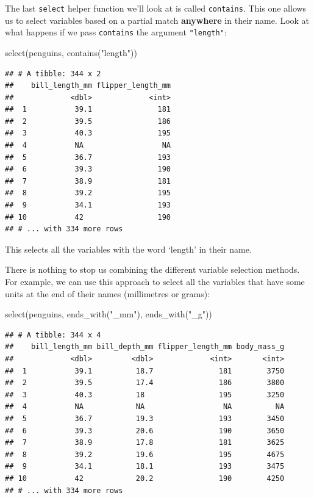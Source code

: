 \documentclass[
]{book}
\newenvironment{Shaded}{\begin{snugshade}}{\end{snugshade}}
\newcommand{\FunctionTok}[1]{\textcolor[rgb]{0.00,0.00,0.00}{#1}}
\newcommand{\NormalTok}[1]{#1}
\newcommand{\StringTok}[1]{\textcolor[rgb]{0.31,0.60,0.02}{#1}}
\begin{document}
The last \texttt{select} helper function we'll look at is called \texttt{contains}. This one allows us to select variables based on a partial match \textbf{anywhere} in their name. Look at what happens if we pass \texttt{contains} the argument \texttt{"length"}:

\begin{Shaded}
\begin{Highlighting}[]
\FunctionTok{select}\NormalTok{(penguins, }\FunctionTok{contains}\NormalTok{(}\StringTok{"length"}\NormalTok{))}
\end{Highlighting}
\end{Shaded}

\begin{verbatim}
## # A tibble: 344 x 2
##    bill_length_mm flipper_length_mm
##             <dbl>             <int>
##  1           39.1               181
##  2           39.5               186
##  3           40.3               195
##  4           NA                  NA
##  5           36.7               193
##  6           39.3               190
##  7           38.9               181
##  8           39.2               195
##  9           34.1               193
## 10           42                 190
## # ... with 334 more rows
\end{verbatim}

This selects all the variables with the word `length' in their name.

There is nothing to stop us combining the different variable selection methods. For example, we can use this approach to select all the variables that have some units at the end of their names (millimetres or grams):

\begin{Shaded}
\begin{Highlighting}[]
\FunctionTok{select}\NormalTok{(penguins, }\FunctionTok{ends\_with}\NormalTok{(}\StringTok{"\_mm"}\NormalTok{), }\FunctionTok{ends\_with}\NormalTok{(}\StringTok{"\_g"}\NormalTok{))}
\end{Highlighting}
\end{Shaded}

\begin{verbatim}
## # A tibble: 344 x 4
##    bill_length_mm bill_depth_mm flipper_length_mm body_mass_g
##             <dbl>         <dbl>             <int>       <int>
##  1           39.1          18.7               181        3750
##  2           39.5          17.4               186        3800
##  3           40.3          18                 195        3250
##  4           NA            NA                  NA          NA
##  5           36.7          19.3               193        3450
##  6           39.3          20.6               190        3650
##  7           38.9          17.8               181        3625
##  8           39.2          19.6               195        4675
##  9           34.1          18.1               193        3475
## 10           42            20.2               190        4250
## # ... with 334 more rows
\end{verbatim}
\end{document}
